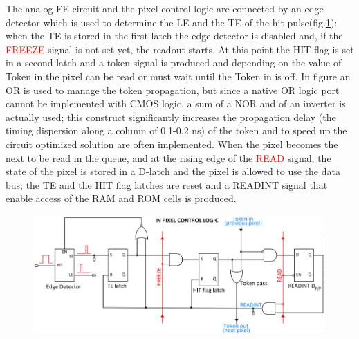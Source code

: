     The analog FE circuit and the pixel control logic are connected by an edge detector which is used to determine the LE and the TE of the hit pulse(fig.\ref{fig:pixel_logic}): when the TE is stored in the first latch the edge detector is disabled and, if the \textcolor{red}{FREEZE} signal is not set yet, the readout starts. 
    At this point the HIT flag is set in a second latch and a token signal is produced and depending on the value of \textcolor{Cerulean}{Token in} the pixel can be read or must wait until the \textcolor{Cerulean}{Token in} is off. In figure an OR is used to manage the token propagation, but since a native OR logic port cannot be implemented with CMOS logic, a sum of a NOR and of an inverter is actually used; this construct significantly increases the propagation delay (the timing dispersion along a column of 0.1-0.2 ns) of the token and to speed up the circuit optimized solution are often implemented.  
    When the pixel becomes the next to be read in the queue, and at the rising edge of the \textcolor{red}{READ} signal, the state of the pixel is stored in a D-latch and the pixel is allowed to use the data bus; the TE and the HIT flag latches are reset and a \textcolor{Cerulean}{READINT} signal that enable access of the RAM and ROM cells is produced.
    \begin{figure}[h!]
        \centering
        \includegraphics[width=.9\linewidth]{figures/Monopix1/Monopix1_readout_schematics.png}
        \caption{}
        \label{fig:pixel_logic}
    \end{figure}
    
